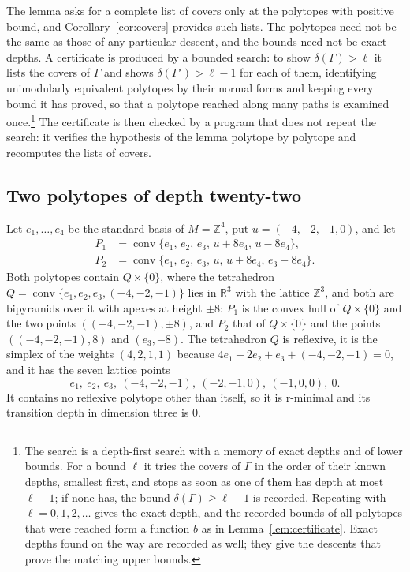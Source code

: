 \documentclass[11pt]{amsart}
\theoremstyle{definition}
\theoremstyle{remark}
\newcommand{\conv}{\operatorname{conv}}
\begin{document}
The lemma asks for a complete list of covers only at the polytopes with
positive bound, and Corollary~\ref{cor:covers} provides such lists. The
polytopes need not be the same as those of any particular descent, and the
bounds need not be exact depths. A certificate is produced by a bounded
search: to show $\delta(\Gamma)>\ell$ it lists the covers of $\Gamma$ and
shows $\delta(\Gamma')>\ell-1$ for each of them, identifying unimodularly
equivalent polytopes by their normal forms and keeping every bound it has
proved, so that a polytope reached along many paths is examined
once.\footnote{The search is a depth-first search with a memory of exact
depths and of lower bounds. For a bound $\ell$ it tries the covers of
$\Gamma$ in the order of their known depths, smallest first, and stops as
soon as one of them has depth at most $\ell-1$; if none has, the bound
$\delta(\Gamma)\ge\ell+1$ is recorded. Repeating with $\ell=0,1,2,\dots$
gives the exact depth, and the recorded bounds of all polytopes that were
reached form a function $b$ as in Lemma~\ref{lem:certificate}. Exact depths
found on the way are recorded as well; they give the descents that prove the
matching upper bounds.} The certificate is then checked by a program that
does not repeat the search: it verifies the hypothesis of the lemma
polytope by polytope and recomputes the lists of covers.

\subsection{Two polytopes of depth twenty-two}\label{ssec:depth22}

Let $e_1,\dots,e_4$ be the standard basis of $M=\mathbb{Z}^4$, put
$u=(-4,-2,-1,0)$, and let
\begin{align*}
P_1&=\conv\{e_1,\,e_2,\,e_3,\,u+8e_4,\,u-8e_4\},\\
P_2&=\conv\{e_1,\,e_2,\,e_3,\,u,\,u+8e_4,\,e_3-8e_4\}.
\end{align*}
Both polytopes contain $Q\times\{0\}$, where the tetrahedron
$Q=\conv\{e_1,e_2,e_3,(-4,-2,-1)\}$ lies in $\mathbb{R}^3$ with the
lattice $\mathbb{Z}^3$, and both are bipyramids over it with apexes
at height $\pm8$: $P_1$ is the convex hull of $Q\times\{0\}$ and the two
points $((-4,-2,-1),\pm8)$, and $P_2$ that of $Q\times\{0\}$ and the points
$((-4,-2,-1),8)$ and $(e_3,-8)$. The tetrahedron $Q$ is reflexive, it is the
simplex of the weights $(4,2,1,1)$ because $4e_1+2e_2+e_3+(-4,-2,-1)=0$, and
it has the seven lattice points
\[
e_1,\ e_2,\ e_3,\ (-4,-2,-1),\ (-2,-1,0),\ (-1,0,0),\ 0.
\]
It contains no reflexive polytope other than itself, so it is r-minimal
and its transition depth in dimension three is $0$.
\end{document}
